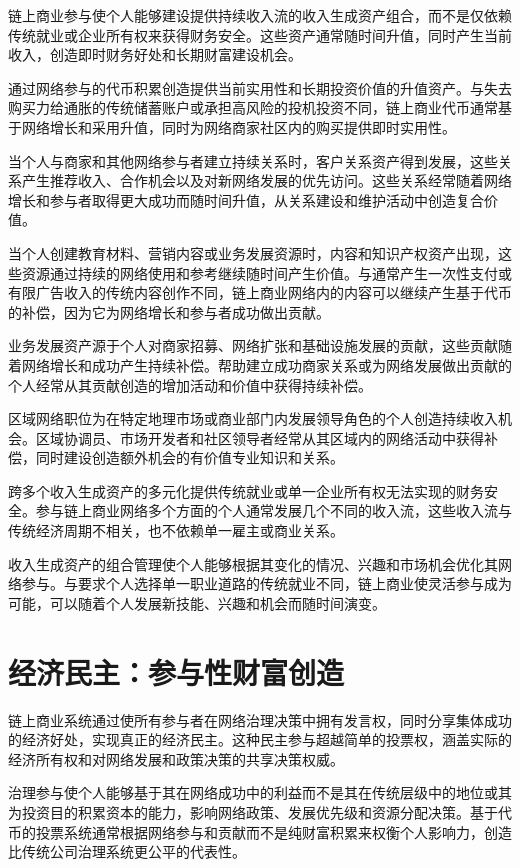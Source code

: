 \documentclass[
  Letterpaper,
]{scrbook}
\begin{document}
链上商业参与使个人能够建设提供持续收入流的收入生成资产组合，而不是仅依赖传统就业或企业所有权来获得财务安全。这些资产通常随时间升值，同时产生当前收入，创造即时财务好处和长期财富建设机会。

通过网络参与的代币积累创造提供当前实用性和长期投资价值的升值资产。与失去购买力给通胀的传统储蓄账户或承担高风险的投机投资不同，链上商业代币通常基于网络增长和采用升值，同时为网络商家社区内的购买提供即时实用性。

当个人与商家和其他网络参与者建立持续关系时，客户关系资产得到发展，这些关系产生推荐收入、合作机会以及对新网络发展的优先访问。这些关系经常随着网络增长和参与者取得更大成功而随时间升值，从关系建设和维护活动中创造复合价值。

当个人创建教育材料、营销内容或业务发展资源时，内容和知识产权资产出现，这些资源通过持续的网络使用和参考继续随时间产生价值。与通常产生一次性支付或有限广告收入的传统内容创作不同，链上商业网络内的内容可以继续产生基于代币的补偿，因为它为网络增长和参与者成功做出贡献。

业务发展资产源于个人对商家招募、网络扩张和基础设施发展的贡献，这些贡献随着网络增长和成功产生持续补偿。帮助建立成功商家关系或为网络发展做出贡献的个人经常从其贡献创造的增加活动和价值中获得持续补偿。

区域网络职位为在特定地理市场或商业部门内发展领导角色的个人创造持续收入机会。区域协调员、市场开发者和社区领导者经常从其区域内的网络活动中获得补偿，同时建设创造额外机会的有价值专业知识和关系。

跨多个收入生成资产的多元化提供传统就业或单一企业所有权无法实现的财务安全。参与链上商业网络多个方面的个人通常发展几个不同的收入流，这些收入流与传统经济周期不相关，也不依赖单一雇主或商业关系。

收入生成资产的组合管理使个人能够根据其变化的情况、兴趣和市场机会优化其网络参与。与要求个人选择单一职业道路的传统就业不同，链上商业使灵活参与成为可能，可以随着个人发展新技能、兴趣和机会而随时间演变。

\section{经济民主：参与性财富创造}\label{ux7ecfux6d4eux6c11ux4e3bux53c2ux4e0eux6027ux8d22ux5bccux521bux9020}

链上商业系统通过使所有参与者在网络治理决策中拥有发言权，同时分享集体成功的经济好处，实现真正的经济民主。这种民主参与超越简单的投票权，涵盖实际的经济所有权和对网络发展和政策决策的共享决策权威。

治理参与使个人能够基于其在网络成功中的利益而不是其在传统层级中的地位或其为投资目的积累资本的能力，影响网络政策、发展优先级和资源分配决策。基于代币的投票系统通常根据网络参与和贡献而不是纯财富积累来权衡个人影响力，创造比传统公司治理系统更公平的代表性。
\end{document}
